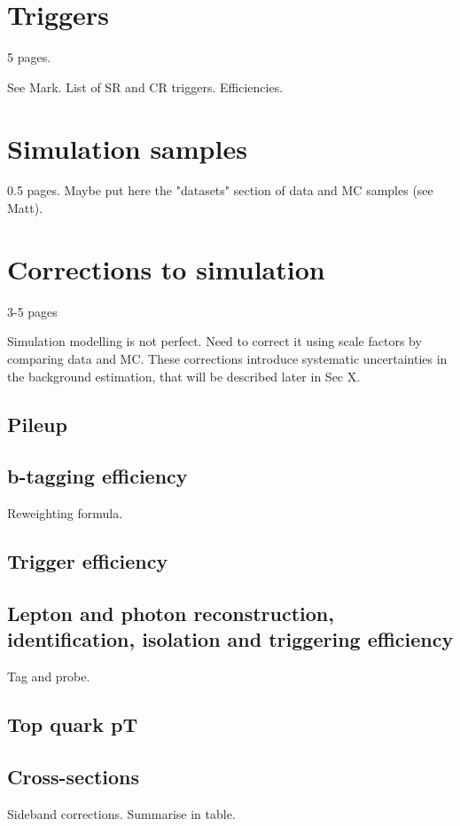 
\section{Triggers}
\label{sec:analysis-trigger}
5 pages.

See Mark.
List of SR and CR triggers.
Efficiencies.

\section{Simulation samples}
0.5 pages.
Maybe put here the "datasets" section of data and MC samples (see Matt).

\section{Corrections to simulation}
3-5 pages

Simulation modelling is not perfect. Need to correct it using scale factors by 
comparing data and MC. These corrections introduce systematic uncertainties in 
the background estimation, that will be described later in Sec X.

\subsection{Pileup}
\subsection{b-tagging efficiency}
Reweighting formula.
\subsection{Trigger efficiency}
\subsection{Lepton and photon reconstruction, identification, isolation and 
triggering efficiency}
Tag and probe.
\subsection{Top quark pT}
\subsection{Cross-sections}
Sideband corrections.
Summarise in table.

